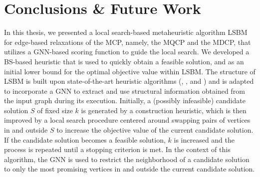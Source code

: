 \documentclass[draft,final]{vutinfth} %
\begin{document}

\chapter{Conclusions \& Future Work}\label{chp:conclusions}

In this thesis, we presented a local search-based metaheuristic algorithm LSBM for edge-based relaxations of the MCP, namely, the MQCP and the MDCP, that utilizes a GNN-based scoring function to guide the local search. 
We developed a BS-based heuristic that is used to quickly obtain a feasible solution, and as an initial lower bound for the optimal objective value within LSBM. 
The structure of LSBM is built upon state-of-the-art heuristic algorithms (\cite{djeddi_extension_2019}, \cite{zhou_opposition-based_2020}, and \cite{chen_nuqclq_2021}) and is adapted to incorporate a GNN to extract and use structural information obtained from the input graph during its execution. 
Initially, a (possibly infeasible) candidate solution $S$ of fixed size $k$ is generated by a construction heuristic, which is then improved by a local search procedure centered around swapping pairs of vertices in and outside $S$ to increase the objective value of the current candidate solution. If the candidate solution becomes a feasible solution, $k$ is increased and the process is repeated until a stopping criterion is met. 
In the context of this algorithm, the GNN is used to restrict the neighborhood of a candidate solution to only the most promising vertices in and outside the current candidate solution. 
\end{document}
